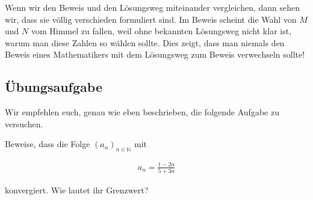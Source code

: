 \documentclass[fontsize=9pt,
               parskip=half-,
               DIV=14,
               listof=chapterentry,
               tocflat]{scrbook}
\begin{document}
Wenn wir den Beweis und den Lösungsweg miteinander vergleichen, dann sehen wir, dass sie völlig verschieden formuliert sind. Im Beweis scheint die Wahl von $M$ und $N$ vom Himmel zu fallen, weil ohne bekannten Lösungsweg nicht klar ist, warum man diese Zahlen so wählen sollte. Dies zeigt, dass man niemals den Beweis eines Mathematikers mit dem Lösungsweg zum Beweis verwechseln sollte!

\subsection{Übungsaufgabe}

Wir empfehlen euch, genau wie eben beschrieben, die folgende Aufgabe zu versuchen.

\begin{exercise*}
Beweise, dass die Folge $(a_{n})_{n\in \mathbb {N} }$ mit

\begin{align*}
a_{n}={\frac {1-2n}{5+3n}}
\end{align*}

konvergiert. Wie lautet ihr Grenzwert?

\end{exercise*}
\end{document}
